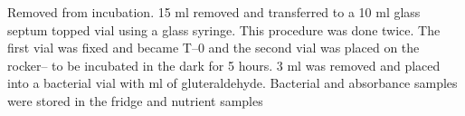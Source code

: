 Removed from incubation. 15 ml removed and transferred to a 10 ml glass septum topped vial using a glass syringe. This procedure was done twice. The first vial was fixed and became T--0 and the second vial was placed on the rocker-- to be incubated in the dark for 5 hours. 3 ml was removed and placed into a bacterial vial with ml of gluteraldehyde. Bacterial and absorbance samples were stored in the fridge and nutrient samples  